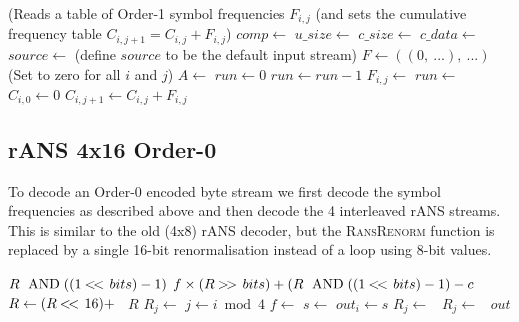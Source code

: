 \documentclass[a4paper]{article}
\begin{document}
\begin{algorithmic}[1]
\Statex (Reads a table of Order-1 symbol frequencies $F_{i,j}$
\Statex (and sets the cumulative frequency table $C_{i,j+1} = C_{i,j}+F_{i,j}$)
\State $comp \gets$ 
  \State $u\_size \gets$  
  \State $c\_size \gets$  
  \State $c\_data \gets$ 
  \State $source \gets$  
\Else
  \State (define $source$ to be the default input stream)
\EndIf
\Statex
\State $F \gets ((0,\ ...),\ ...)$ \Comment(Set to zero for all $i$ and $j$)
\State $A \gets$ 
  \State $run \gets 0$
      \State $run \gets run-1$ 
    \Else
      \State $F_{i,j} \gets$ 
        \State $run \gets$ 
      \EndIf
    \EndIf
  \EndForeach
  \State {}
  \State
  \State $C_{i,0} \gets 0$
    \State $C_{i,j+1} \gets C_{i,j} + F_{i,j}$
  \EndFor
\EndForeach
\EndProcedure
\end{algorithmic}

\subsection{rANS 4x16 Order-0}

To decode an Order-0 encoded byte stream we first decode the symbol
frequencies as described above and then decode the 4 interleaved rANS
streams.  This is similar to the old (4x8) rANS decoder, but the
\textsc{RansRenorm} function is replaced by a single 16-bit
renormalisation instead of a loop using 8-bit values.

\begin{algorithmic}[1]
  \State \Return $R\ \bitand ((1 \shiftl bits) -1)$
\EndFunction
{}
  \State \Return $f \times (R \shiftr bits) + (R\ \bitand ((1 \shiftl bits) -1) - c$
\EndFunction
\Statex
{}
    \State $R \gets (R \mathbin{<\mkern-3mu<\,} 16) +$\ 
  \EndIf
  \State \Return $R$
\EndFunction
\Statex
{}
  \State {}
    \State $R_j \gets$ 
  \EndFor
    \State $j \gets i \bmod 4$
    \State $f \gets$ 
    \State $s \gets$ 
    \State $out_i \gets s$
    \State $R_j \gets$\ 
    \State $R_j \gets$\ 
  \EndFor
  \State \Return $out$
\EndFunction
\end{algorithmic}
\end{document}
